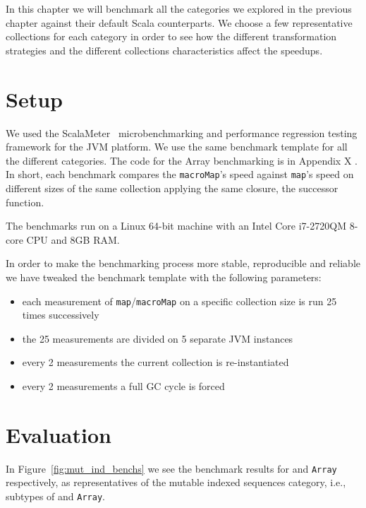 \label{benchmarks}

In this chapter we will benchmark all the categories we explored in
the previous chapter against their default Scala counterparts. We choose a few
representative collections for each category in order to see how the different
transformation strategies and the different collections characteristics affect
the speedups.

\section{Setup}

We used the ScalaMeter~\cite{axel22:scalameter} microbenchmarking and performance regression
testing framework for the JVM platform. We use the same benchmark template for
all the different categories. The code for the Array benchmarking is in Appendix X
. In short, each benchmark compares the \texttt{macroMap}'s speed against \texttt{map}'s speed
on different sizes of the same collection applying the same closure, the
successor function.

The benchmarks run on a Linux 64-bit machine with an Intel Core i7-2720QM 8-core
CPU and 8GB RAM.

In order to make the benchmarking process more stable, reproducible and reliable
we have tweaked the benchmark template with the following parameters:

\begin{itemize}
 \item 
  each measurement of \texttt{map}/\texttt{macroMap} on a specific collection size is run 25
times successively
 \item
  the 25 measurements are divided on 5 separate JVM instances
 \item
  every 2 measurements the current collection is re-instantiated
 \item
  every 2 measurements a full GC cycle is forced
\end{itemize}


\section{Evaluation}

In Figure~\ref{fig:mut_ind_benchs} we see the benchmark results for  
and \texttt{Array} respectively, as representatives of the mutable indexed
sequences category, i.e., subtypes of  and
\texttt{Array}.

